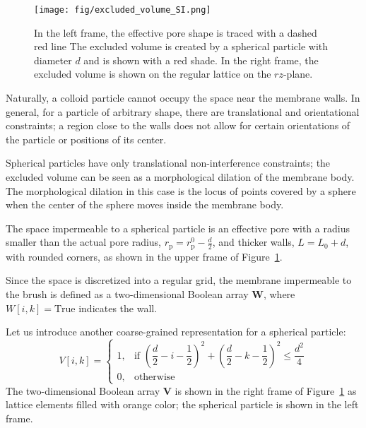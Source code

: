 \documentclass[10pt, a4paper]{article}
\begin{document}
\begin{multicols}{2}

\begin{figure}[H]
    \centering
    \texttt{[image: fig/excluded\_volume\_SI.png]}
    \caption{
        In the left frame, the effective pore shape is traced with a dashed red line
        The excluded volume is created by a spherical particle with diameter $d$ and is shown with a red shade.
        In the right frame, the excluded volume is shown on the regular lattice on the $rz$-plane.
        }
    \label{fig:excluded_volume}
\end{figure}

Naturally, a colloid particle cannot occupy the space near the membrane walls.
In general, for a particle of arbitrary shape, there are translational and orientational constraints; a region close to the walls does not allow for certain orientations of the particle or positions of its center.

Spherical particles have only translational non-interference constraints; the excluded volume can be seen as a morphological dilation of the membrane body.
The morphological dilation in this case is the locus of points covered by a sphere when the center of the sphere moves inside the membrane body.

The space impermeable to a spherical particle is an effective pore with a radius smaller than the actual pore radius, $r_{\text{p}} = r_{\text{p}}^{0} - \frac{d}{2}$, and thicker walls, $L = L_{0} + d$, with rounded corners, as shown in the upper frame of Figure~\ref{fig:excluded_volume}.

Since the space is discretized into a regular grid, the membrane impermeable to the brush is defined as a two-dimensional Boolean array $\bm{W}$, where $W[i, k] = \text{True}$ indicates the wall.

Let us introduce another coarse-grained representation for a spherical particle:
\begin{equation}
    V[i, k] = 
    \begin{cases}
            1, & \text{if } \left( \dfrac{d}{2} - i - \dfrac{1}{2} \right)^2 + \left( \dfrac{d}{2} - k - \dfrac{1}{2} \right)^2 \le \dfrac{d^2}{4} \\
            0, & \text{otherwise}
        \end{cases}
\end{equation}
The two-dimensional Boolean array $\bm{V}$ is shown in the right frame of Figure~\ref{fig:excluded_volume} as lattice elements filled with orange color; the spherical particle is shown in the left frame.


\end{multicols}
\end{document}
